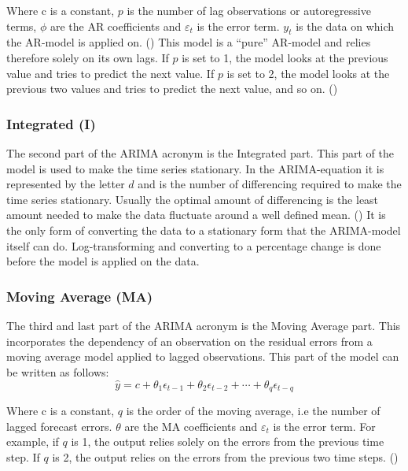 Where c is a constant, $p$ is the number of lag observations or autoregressive terms, $\phi$ are the AR coefficients and $\varepsilon_{t}$ is the error term. $y_{t}$ is the data on which the AR-model is applied on. (\cite{oracle_ARIMA}) This model is a ``pure'' AR-model and relies therefore solely on its own lags. If $p$ is set to 1, the model looks at the previous value and tries to predict the next value. If $p$ is set to 2, the model looks at the previous two values and tries to predict the next value, and so on. (\cite{artley_2022})


\subsubsection{Integrated (I)}\label{IntegratedTheory}
The second part of the ARIMA acronym is the Integrated part. This part of the model is used to make the time series stationary. In the ARIMA-equation it is represented by the letter $d$ and is the number of differencing required to make the time series stationary. Usually the optimal amount of differencing is the least amount needed to make the data fluctuate around a well defined mean. (\cite{nau_2019}) It is the only form of converting the data to a stationary form that the ARIMA-model itself can do. Log-transforming and converting to a percentage change is done before the model is applied on the data. 

\subsubsection{Moving Average (MA)}\label{MovingAverageTheory}
The third and last part of the ARIMA acronym is the Moving Average part. This incorporates the dependency of an observation on the residual errors from a moving average model applied to lagged observations. \parencite{hayes_2019} This part of the model can be written as follows:
\begin{equation}
\hat{y} = c + \theta_1\epsilon_{t-1} + \theta_2\epsilon_{t-2} + \cdots + \theta_q\epsilon_{t-q}
\end{equation}

Where c is a constant, $q$ is the order of the moving average, i.e the number of lagged forecast errors. $\theta$ are the MA coefficients and $\varepsilon_{t}$ is the error term. For example, if $q$ is 1, the output relies solely on the errors from the previous time step. If $q$ is 2, the output relies on the errors from the previous two time steps. (\cite{hyndman_athanasopoulos_2021}) 

